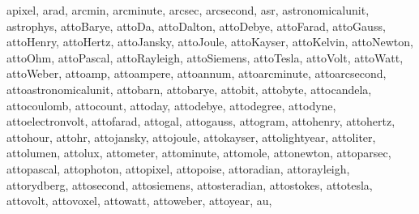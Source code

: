 \documentclass[letterpaper,10pt,english]{sphinxmanual}
\begin{document}
\begin{sphinxVerbatim}[commandchars=\\\{\}]
 \PYGZsq{}apixel\PYGZsq{},
 \PYGZsq{}arad\PYGZsq{},
 \PYGZsq{}arcmin\PYGZsq{},
 \PYGZsq{}arcminute\PYGZsq{},
 \PYGZsq{}arcsec\PYGZsq{},
 \PYGZsq{}arcsecond\PYGZsq{},
 \PYGZsq{}asr\PYGZsq{},
 \PYGZsq{}astronomical\PYGZus{}unit\PYGZsq{},
 \PYGZsq{}astrophys\PYGZsq{},
 \PYGZsq{}attoBarye\PYGZsq{},
 \PYGZsq{}attoDa\PYGZsq{},
 \PYGZsq{}attoDalton\PYGZsq{},
 \PYGZsq{}attoDebye\PYGZsq{},
 \PYGZsq{}attoFarad\PYGZsq{},
 \PYGZsq{}attoGauss\PYGZsq{},
 \PYGZsq{}attoHenry\PYGZsq{},
 \PYGZsq{}attoHertz\PYGZsq{},
 \PYGZsq{}attoJansky\PYGZsq{},
 \PYGZsq{}attoJoule\PYGZsq{},
 \PYGZsq{}attoKayser\PYGZsq{},
 \PYGZsq{}attoKelvin\PYGZsq{},
 \PYGZsq{}attoNewton\PYGZsq{},
 \PYGZsq{}attoOhm\PYGZsq{},
 \PYGZsq{}attoPascal\PYGZsq{},
 \PYGZsq{}attoRayleigh\PYGZsq{},
 \PYGZsq{}attoSiemens\PYGZsq{},
 \PYGZsq{}attoTesla\PYGZsq{},
 \PYGZsq{}attoVolt\PYGZsq{},
 \PYGZsq{}attoWatt\PYGZsq{},
 \PYGZsq{}attoWeber\PYGZsq{},
 \PYGZsq{}attoamp\PYGZsq{},
 \PYGZsq{}attoampere\PYGZsq{},
 \PYGZsq{}attoannum\PYGZsq{},
 \PYGZsq{}attoarcminute\PYGZsq{},
 \PYGZsq{}attoarcsecond\PYGZsq{},
 \PYGZsq{}attoastronomical\PYGZus{}unit\PYGZsq{},
 \PYGZsq{}attobarn\PYGZsq{},
 \PYGZsq{}attobarye\PYGZsq{},
 \PYGZsq{}attobit\PYGZsq{},
 \PYGZsq{}attobyte\PYGZsq{},
 \PYGZsq{}attocandela\PYGZsq{},
 \PYGZsq{}attocoulomb\PYGZsq{},
 \PYGZsq{}attocount\PYGZsq{},
 \PYGZsq{}attoday\PYGZsq{},
 \PYGZsq{}attodebye\PYGZsq{},
 \PYGZsq{}attodegree\PYGZsq{},
 \PYGZsq{}attodyne\PYGZsq{},
 \PYGZsq{}attoelectronvolt\PYGZsq{},
 \PYGZsq{}attofarad\PYGZsq{},
 \PYGZsq{}attogal\PYGZsq{},
 \PYGZsq{}attogauss\PYGZsq{},
 \PYGZsq{}attogram\PYGZsq{},
 \PYGZsq{}attohenry\PYGZsq{},
 \PYGZsq{}attohertz\PYGZsq{},
 \PYGZsq{}attohour\PYGZsq{},
 \PYGZsq{}attohr\PYGZsq{},
 \PYGZsq{}attojansky\PYGZsq{},
 \PYGZsq{}attojoule\PYGZsq{},
 \PYGZsq{}attokayser\PYGZsq{},
 \PYGZsq{}attolightyear\PYGZsq{},
 \PYGZsq{}attoliter\PYGZsq{},
 \PYGZsq{}attolumen\PYGZsq{},
 \PYGZsq{}attolux\PYGZsq{},
 \PYGZsq{}attometer\PYGZsq{},
 \PYGZsq{}attominute\PYGZsq{},
 \PYGZsq{}attomole\PYGZsq{},
 \PYGZsq{}attonewton\PYGZsq{},
 \PYGZsq{}attoparsec\PYGZsq{},
 \PYGZsq{}attopascal\PYGZsq{},
 \PYGZsq{}attophoton\PYGZsq{},
 \PYGZsq{}attopixel\PYGZsq{},
 \PYGZsq{}attopoise\PYGZsq{},
 \PYGZsq{}attoradian\PYGZsq{},
 \PYGZsq{}attorayleigh\PYGZsq{},
 \PYGZsq{}attorydberg\PYGZsq{},
 \PYGZsq{}attosecond\PYGZsq{},
 \PYGZsq{}attosiemens\PYGZsq{},
 \PYGZsq{}attosteradian\PYGZsq{},
 \PYGZsq{}attostokes\PYGZsq{},
 \PYGZsq{}attotesla\PYGZsq{},
 \PYGZsq{}attovolt\PYGZsq{},
 \PYGZsq{}attovoxel\PYGZsq{},
 \PYGZsq{}attowatt\PYGZsq{},
 \PYGZsq{}attoweber\PYGZsq{},
 \PYGZsq{}attoyear\PYGZsq{},
 \PYGZsq{}au\PYGZsq{},

\end{sphinxVerbatim}
\end{document}
